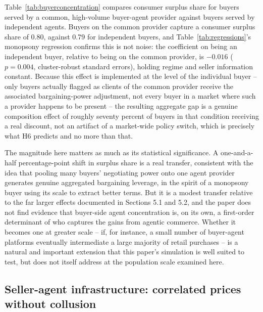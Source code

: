 \documentclass[review]{elsarticle}
\begin{document}
Table~\ref{tab:buyerconcentration} compares consumer surplus share for buyers served by a common, high-volume buyer-agent provider against buyers served by independent agents. Buyers on the common provider capture a consumer surplus share of 0.80, against 0.79 for independent buyers, and Table~\ref{tab:regressions}'s monopsony regression confirms this is not noise: the coefficient on being an independent buyer, relative to being on the common provider, is $-0.016$ ($p=0.004$, cluster-robust standard errors), holding regime and seller information constant. Because this effect is implemented at the level of the individual buyer -- only buyers actually flagged as clients of the common provider receive the associated bargaining-power adjustment, not every buyer in a market where such a provider happens to be present -- the resulting aggregate gap is a genuine composition effect of roughly seventy percent of buyers in that condition receiving a real discount, not an artifact of a market-wide policy switch, which is precisely what H6 predicts and no more than that.

The magnitude here matters as much as its statistical significance. A one-and-a-half percentage-point shift in surplus share is a real transfer, consistent with the idea that pooling many buyers' negotiating power onto one agent provider generates genuine aggregated bargaining leverage, in the spirit of a monopsony buyer using its scale to extract better terms. But it is a modest transfer relative to the far larger effects documented in Sections 5.1 and 5.2, and the paper does not find evidence that buyer-side agent concentration is, on its own, a first-order determinant of who captures the gains from agentic commerce. Whether it becomes one at greater scale -- if, for instance, a small number of buyer-agent platforms eventually intermediate a large majority of retail purchases -- is a natural and important extension that this paper's simulation is well suited to test, but does not itself address at the population scale examined here.

\FloatBarrier
\subsection{Seller-agent infrastructure: correlated prices without collusion}
\label{sec:results-sellerconc}
\end{document}

